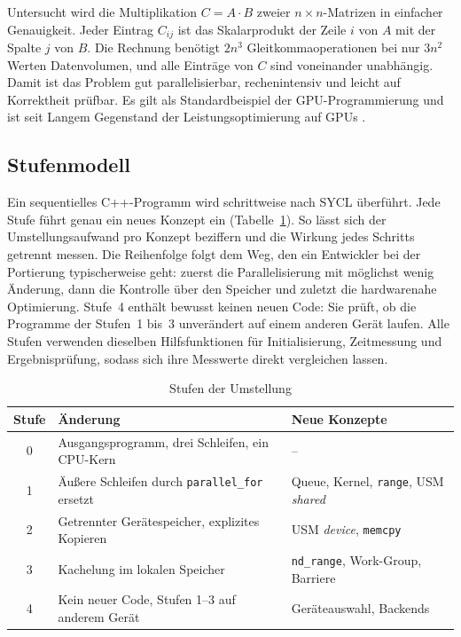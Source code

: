 \documentclass[12pt,a4paper]{article}
\begin{document}
Untersucht wird die Multiplikation $C = A \cdot B$ zweier $n \times
n$-Matrizen in einfacher Genauigkeit. Jeder Eintrag $C_{ij}$ ist das
Skalarprodukt der Zeile $i$ von $A$ mit der Spalte $j$ von $B$. Die Rechnung
benötigt $2n^3$ Gleitkommaoperationen bei nur $3n^2$ Werten Datenvolumen, und
alle Einträge von $C$ sind voneinander unabhängig. Damit ist das Problem gut
parallelisierbar, rechenintensiv und leicht auf Korrektheit prüfbar. Es gilt
als Standardbeispiel der GPU-Programmierung \cite{hwu2022pmpp} und ist seit
Langem Gegenstand der Leistungsoptimierung auf GPUs \cite{volkov2008gemm}.

\subsection{Stufenmodell}

Ein sequentielles C++-Programm wird schrittweise nach SYCL überführt. Jede
Stufe führt genau ein neues Konzept ein (Tabelle~\ref{tab:stufen}). So lässt
sich der Umstellungsaufwand pro Konzept beziffern und die Wirkung jedes
Schritts getrennt messen. Die Reihenfolge folgt dem Weg, den ein Entwickler
bei der Portierung typischerweise geht: zuerst die Parallelisierung mit
möglichst wenig Änderung, dann die Kontrolle über den Speicher und zuletzt
die hardwarenahe Optimierung. Stufe~4 enthält bewusst keinen neuen Code: Sie
prüft, ob die Programme der Stufen~1 bis~3 unverändert auf einem anderen
Gerät laufen. Alle Stufen verwenden dieselben Hilfsfunktionen für
Initialisierung, Zeitmessung und Ergebnisprüfung, sodass sich ihre
Messwerte direkt vergleichen lassen.

\begin{table}[htbp]
\centering
\small
\begin{tabularx}{\textwidth}{@{}c>{\raggedright\arraybackslash}X>{\raggedright\arraybackslash}X@{}}
\toprule
\textbf{Stufe} & \textbf{Änderung} & \textbf{Neue Konzepte} \\
\midrule
0 & Ausgangsprogramm, drei Schleifen, ein CPU-Kern & -- \\
1 & Äußere Schleifen durch \texttt{parallel\_for} ersetzt & Queue, Kernel, \texttt{range}, USM \emph{shared} \\
2 & Getrennter Gerätespeicher, explizites Kopieren & USM \emph{device}, \texttt{memcpy} \\
3 & Kachelung im lokalen Speicher & \texttt{nd\_range}, Work-Group, Barriere \\
4 & Kein neuer Code, Stufen 1--3 auf anderem Gerät & Geräteauswahl, Backends \\
\bottomrule
\end{tabularx}
\caption{Stufen der Umstellung}
\label{tab:stufen}
\end{table}
\end{document}
